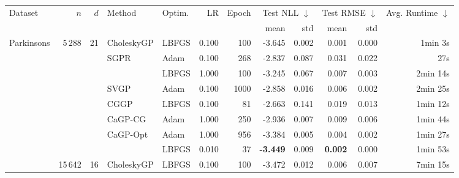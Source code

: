 \begin{tabular}{lrrllrrrrrrr}
    \toprule
    \multirow{2}{*}{Dataset} & \multirow{2}{*}{$n$} & \multirow{2}{*}{$d$} & \multirow{2}{*}{Method}& \multirow{2}{*}{Optim.} & \multirow{2}{*}{LR} & \multirow{2}{*}{Epoch} &
    \multicolumn{2}{c}{Test NLL $\downarrow$} & \multicolumn{2}{c}{Test RMSE $\downarrow$} &
    \multirow{2}{*}{Avg. Runtime $\downarrow$} \\
    \cmidrule(lr){8-9} \cmidrule(lr){10-11}
    &  &  &  &  &  & & mean & std & mean & std & \\
    \midrule
\multirow[t]{7}{*}{Parkinsons \citep{Tsanas2009ParkinsonsTelemonitoring}} & \multirow[t]{7}{*}{5\,288} & \multirow[t]{7}{*}{21} & \textcolor{CholeskyGP}{CholeskyGP} & \textcolor{CholeskyGP}{LBFGS} & \textcolor{CholeskyGP}{0.100} & \textcolor{CholeskyGP}{100}
& \textcolor{CholeskyGP}{-3.645} & \textcolor{CholeskyGP}{0.002} & \textcolor{CholeskyGP}{0.001} & \textcolor{CholeskyGP}{0.000} &  \textcolor{CholeskyGP}{\phantom{0}1min \phantom{0}3s}\\
 &  &  & \multirow[t]{2}{*}{\textcolor{SGPR}{SGPR}} & Adam & 0.100 & 268 & -2.837 & 0.087 & 0.031 & 0.022 & 27s\\
 &  &  &  & LBFGS & 1.000 & 100 & -3.245 & 0.067 & 0.007 & 0.003 & 2min 14s\\
 &  &  & \textcolor{SVGP}{SVGP} & Adam & 0.100 & 1000 & -2.858 & 0.016 & 0.006 & 0.002 & 2min 25s\\ 
 &  &  & \textcolor{CGGP}{CGGP} & LBFGS & 0.100 & 81 & -2.663 & 0.141 & 0.019 & 0.013 & 1min 12s\\
 &  &  & \textcolor{CaGP-CG}{CaGP-CG} & Adam & 1.000 & 250 & -2.936 & 0.007 & 0.009 & 0.006 & 1min 44s\\
 &  &  & \multirow[t]{2}{*}{\textcolor{CaGP-Opt}{CaGP-Opt}} & Adam & 1.000 & 956 & -3.384 & 0.005 & 0.004 & 0.002 & 1min 27s\\
 &  &  &  & LBFGS & 0.010 & 37 & \textcolor{CaGP-Opt}{\bfseries-3.449} & 0.009 & \textcolor{CaGP-Opt}{\bfseries0.002} & 0.000 & 1min 53s\\
\arrayrulecolor{lightgray}\cmidrule(lr){1-12}
\multirow[t]{6}{*}{Bike \citep{Fanaee2013BikeSharing}} & \multirow[t]{6}{*}{15\,642} & \multirow[t]{6}{*}{16} & \multirow[t]{2}{*}{\textcolor{CholeskyGP}{CholeskyGP}} & \textcolor{CholeskyGP}{LBFGS} & \textcolor{CholeskyGP}{0.100} & \textcolor{CholeskyGP}{100} & \textcolor{CholeskyGP}{-3.472} & \textcolor{CholeskyGP}{0.012} & \textcolor{CholeskyGP}{0.006} & \textcolor{CholeskyGP}{0.007} & \textcolor{CholeskyGP}{7min 15s}\\

\end{tabular}

